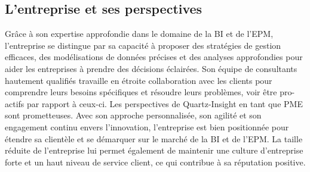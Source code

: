 \documentclass[a4paper, 11pt]{report}
\begin{document}
\subsection{L'entreprise et ses perspectives}
Grâce à son expertise approfondie dans le domaine de la BI et de l'EPM, l’entreprise se distingue par sa capacité à proposer des stratégies de gestion efficaces, des modélisations de données précises et des analyses approfondies pour aider les entreprises à prendre des décisions éclairées.
Son équipe de consultants hautement qualifiés travaille en étroite collaboration avec les clients pour comprendre leurs besoins spécifiques et résoudre leurs problèmes, voir être pro-actifs par rapport à ceux-ci.
\newline
\newline
Les perspectives de Quartz-Insight en tant que PME sont prometteuses.
Avec son approche personnalisée, son agilité et son engagement continu envers l'innovation, l'entreprise est bien positionnée pour étendre sa clientèle et se démarquer sur le marché de la BI et de l'EPM.
La taille réduite de l'entreprise lui permet également de maintenir une culture d'entreprise forte et un haut niveau de service client, ce qui contribue à sa réputation positive.
\end{document}

